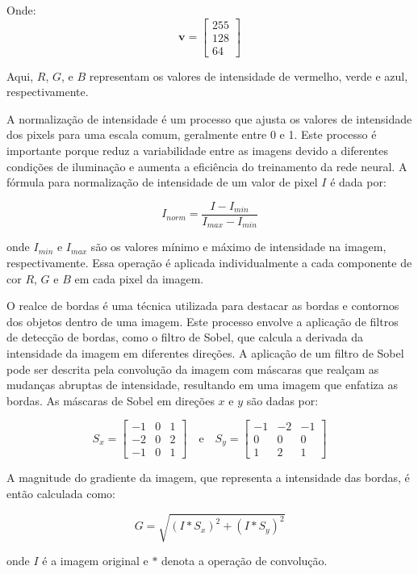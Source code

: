 \documentclass{article}
\begin{document}
Onde:
\[
\mathbf{v} = \begin{bmatrix}
255 \\
128 \\
64
\end{bmatrix}
\]

Aqui, \( R \), \( G \), e \( B \) representam os valores de intensidade de vermelho, verde e azul, respectivamente.

A normalização de intensidade é um processo que ajusta os valores de intensidade dos pixels para uma escala comum, geralmente entre 0 e 1. Este processo é importante porque reduz a variabilidade entre as imagens devido a diferentes condições de iluminação e aumenta a eficiência do treinamento da rede neural. A fórmula para normalização de intensidade de um valor de pixel \( I \) é dada por:

\[
I_{norm} = \frac{I - I_{min}}{I_{max} - I_{min}}
\]

onde \( I_{min} \) e \( I_{max} \) são os valores mínimo e máximo de intensidade na imagem, respectivamente. Essa operação é aplicada individualmente a cada componente de cor \( R \), \( G \) e \( B \) em cada pixel da imagem.

O realce de bordas é uma técnica utilizada para destacar as bordas e contornos dos objetos dentro de uma imagem. Este processo envolve a aplicação de filtros de detecção de bordas, como o filtro de Sobel, que calcula a derivada da intensidade da imagem em diferentes direções. A aplicação de um filtro de Sobel pode ser descrita pela convolução da imagem com máscaras que realçam as mudanças abruptas de intensidade, resultando em uma imagem que enfatiza as bordas. As máscaras de Sobel em direções \( x \) e \( y \) são dadas por:

\[
S_x = \begin{bmatrix}
-1 & 0 & 1 \\
-2 & 0 & 2 \\
-1 & 0 & 1
\end{bmatrix}
\quad \text{e} \quad
S_y = \begin{bmatrix}
-1 & -2 & -1 \\
0 & 0 & 0 \\
1 & 2 & 1
\end{bmatrix}
\]

A magnitude do gradiente da imagem, que representa a intensidade das bordas, é então calculada como:

\[
G = \sqrt{(I * S_x)^2 + (I * S_y)^2}
\]

onde \( I \) é a imagem original e \( * \) denota a operação de convolução.
\end{document}
